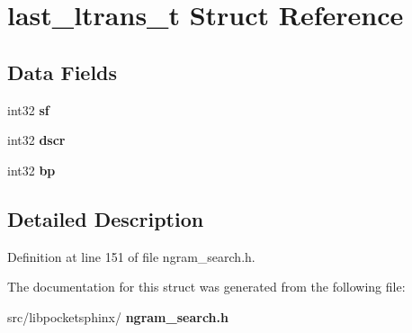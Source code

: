 \section{last\+\_\+ltrans\+\_\+t Struct Reference}
\label{structlast__ltrans__t}
\subsection*{Data Fields}
\begin{DoxyCompactItemize}
\item 
\mbox{\label{structlast__ltrans__t_acaf16ee92b14121c8e357ff4c1c517d7}} 
int32 {\bfseries sf}
\item 
\mbox{\label{structlast__ltrans__t_acef04cbac672e225406402f56002c153}} 
int32 {\bfseries dscr}
\item 
\mbox{\label{structlast__ltrans__t_ae42bf37affec23a3f3ea46131aa82c99}} 
int32 {\bfseries bp}
\end{DoxyCompactItemize}


\subsection{Detailed Description}


Definition at line 151 of file ngram\+\_\+search.\+h.



The documentation for this struct was generated from the following file\+:\begin{DoxyCompactItemize}
\item 
src/libpocketsphinx/\textbf{ ngram\+\_\+search.\+h}\end{DoxyCompactItemize}
